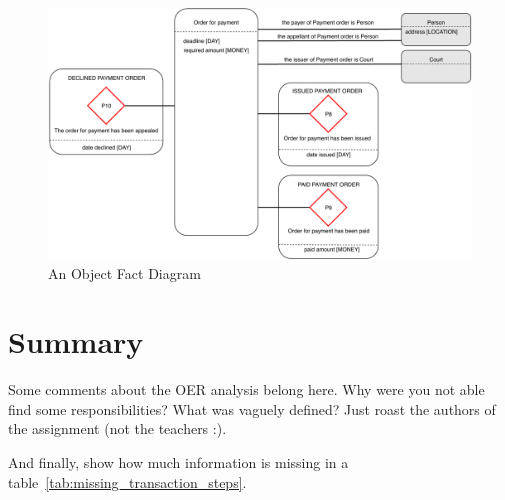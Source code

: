 \begin{figure}[h]\centering
	\includegraphics[width=\textwidth]{pic/ofd}
	\caption{An Object Fact Diagram}
	\label{fig:ofdModel}
\end{figure}

\section{Summary}

Some comments about the OER analysis belong here. Why were you not able find some responsibilities? What was vaguely defined? Just roast the authors of the assignment (not the teachers :). 

And finally, show how much information is missing in a table~\cref{tab:missing_transaction_steps}. 

